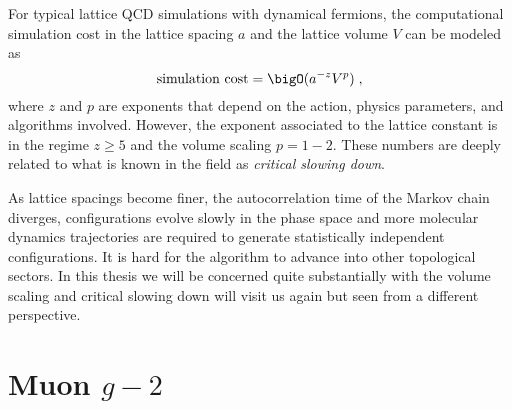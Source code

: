 For typical lattice QCD simulations with dynamical fermions, the computational simulation cost in the lattice spacing $a$ and the lattice volume $V$ can be modeled as~\cite{Luscher:1998pe}
\begin{equation}
\text{simulation cost} = \bigO( a^{-z} V^{p} )\;,
\end{equation}
where $z$ and $p$ are exponents that depend on the action, physics parameters, and algorithms involved.
However, the exponent associated to the lattice constant is in the regime $z \geq 5$ and the volume scaling $p = 1-2$.
These numbers are deeply related to what is known in the field as \emph{critical slowing down}.

As lattice spacings become finer, the autocorrelation time of the Markov chain diverges, configurations evolve slowly in the phase space and more molecular dynamics trajectories are required to generate statistically independent configurations.
It is hard for the algorithm to advance into other topological sectors.
In this thesis we will be concerned quite substantially with the volume scaling and critical slowing down will visit us again but seen from a different perspective.




























\section{Muon $g-2$}
\label{sec:intro:gm2}


